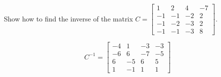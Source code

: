 
\begin{exerciseStatement}


Show how to find the inverse of the matrix \(C= \left[\begin{array}{cccc}
1 & 2 & 4 & -7 \\
-1 & -1 & -2 & 2 \\
-1 & -2 & -3 & 2 \\
-1 & -1 & -3 & 8
\end{array}\right] \).


\end{exerciseStatement}
    
\begin{exerciseAnswer} 
\[C^{-1}= \left[\begin{array}{cccc}
-4 & 1 & -3 & -3 \\
-6 & 6 & -7 & -5 \\
6 & -5 & 6 & 5 \\
1 & -1 & 1 & 1
\end{array}\right] \]
\end{exerciseAnswer}
    
